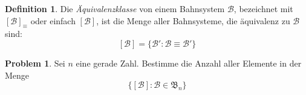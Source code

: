 \documentclass{article}
\theoremstyle{definition}
\newtheorem{defi}{Definition}
\newtheorem*{prob*}{Problem}
\begin{document}
    \begin{defi}
	Die \textit{Äquivalenzklasse} von einem Bahnsystem $\mathcal{B}$, bezeichnet mit $[\mathcal{B}]_\equiv$ oder einfach $[\mathcal{B}]$, ist die Menge aller Bahnsysteme, die äquivalenz zu $\mathcal{B}$ sind:
	\[ [\mathcal{B}] = \{\mathcal{B}':\mathcal{B}\equiv\mathcal{B}'\} \]
    \end{defi}
    
    \begin{prob*}
	Sei $n$ eine gerade Zahl. Bestimme die Anzahl aller Elemente in der Menge
	\[ \{ [\mathcal{B}] : \mathcal{B} \in \mathfrak{B}_n \} \]
    \end{prob*}
\end{document}
